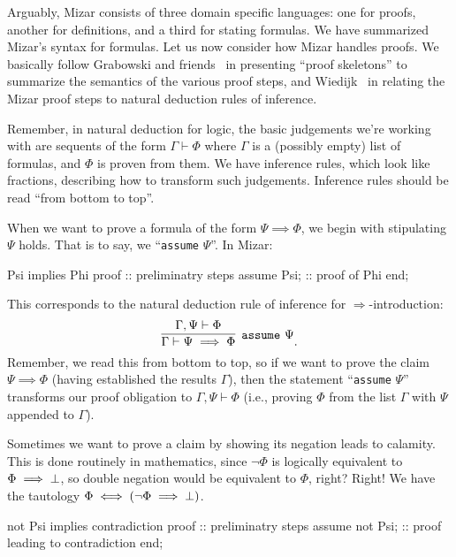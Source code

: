 \M
Arguably, Mizar consists of three domain specific languages: one for
proofs, another for definitions, and a third for stating formulas. We
have summarized Mizar's syntax for formulas. Let us now consider how
Mizar handles proofs. We basically follow Grabowski and
friends~\cite{grabowski2010mizar} in presenting ``proof skeletons'' to
summarize the semantics of the various proof steps, and
Wiedijk~\cite{wiedijk2000mv} in relating the Mizar proof steps to
natural deduction rules of inference.

Remember, in natural deduction for logic, the basic judgements we're
working with are sequents of the form $\Gamma\vdash\Phi$ where $\Gamma$
is a (possibly empty) list of formulas, and $\Phi$ is proven from
them. We have inference rules, which look like fractions, describing how
to transform such judgements. Inference rules should be read ``from
bottom to top''.

When we want to prove a formula of the form $\Psi\implies\Phi$, we begin
with stipulating $\Psi$ holds. That is to say, we ``\verb#assume# $\Psi$''.
In Mizar:

\begin{mizar}
Psi implies Phi
proof
  :: preliminatry steps
  assume Psi;
  :: proof of Phi
end;
\end{mizar}
This corresponds to the natural deduction rule of inference for
$\Longrightarrow$-introduction:
\begin{equation}
  \infer[\mathtt{assume}~\Psi]{\Gamma\vdash\Psi\implies\Phi}{\Gamma,\Psi\vdash\Phi}.
\end{equation}
Remember, we read this from bottom to top, so if we want to prove
the claim $\Psi\implies\Phi$ (having established the results $\Gamma$),
then the statement ``\verb#assume# $\Psi$'' transforms our proof
obligation to $\Gamma,\Psi\vdash\Phi$ (i.e., proving $\Phi$ from the
list $\Gamma$ with $\Psi$ appended to $\Gamma$).

Sometimes we want to prove a claim by showing its negation leads to
calamity. This is done routinely in mathematics, since $\neg\Phi$ is
logically equivalent to $\Phi\implies\bot$, so double negation
would be equivalent to $\Phi$, right? Right! We have the tautology
$\Phi\iff(\neg\Phi\implies\bot)$.

\begin{mizar}
not Psi implies contradiction
proof
  :: preliminatry steps
  assume not Psi;
  :: proof leading to contradiction
end;
\end{mizar}

